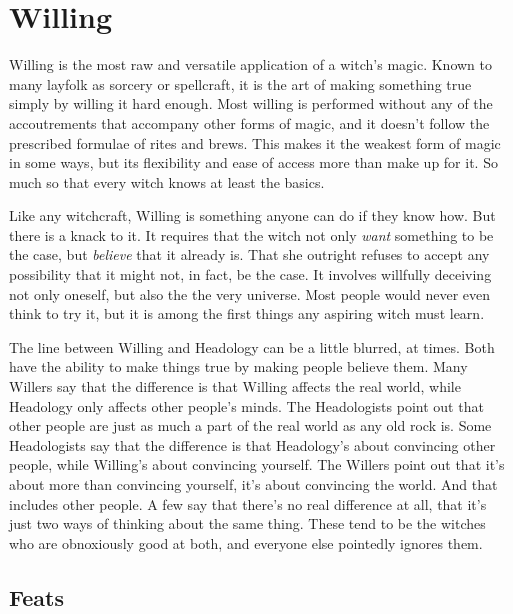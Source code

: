 \chapter{Willing}

Willing is the most raw and versatile application of a witch's magic.
Known to many layfolk as sorcery or spellcraft, it is the art of making something true simply by willing it hard enough.
Most willing is performed without any of the accoutrements that accompany other forms of magic, and it doesn't follow the prescribed formulae of rites and brews.
This makes it the weakest form of magic in some ways, but its flexibility and ease of access more than make up for it.
So much so that every witch knows at least the basics.

Like any witchcraft, Willing is something anyone can do if they know how.
But there is a knack to it.
It requires that the witch not only \emph{want} something to be the case, but \emph{believe} that it already is.
That she outright refuses to accept any possibility that it might not, in fact, be the case.
It involves willfully deceiving not only oneself, but also the the very universe.
Most people would never even think to try it, but it is among the first things any aspiring witch must learn.

The line between Willing and Headology can be a little blurred, at times.
Both have the ability to make things true by making people believe them.
Many Willers say that the difference is that Willing affects the real world, while Headology only affects other people's minds.
The Headologists point out that other people are just as much a part of the real world as any old rock is.
Some Headologists say that the difference is that Headology's about convincing other people, while Willing's about convincing yourself.
The Willers point out that it's about more than convincing yourself, it's about convincing the world.
And that includes other people.
A few say that there's no real difference at all, that it's just two ways of thinking about the same thing.
These tend to be the witches who are obnoxiously good at both, and everyone else pointedly ignores them.

\section{Feats}


